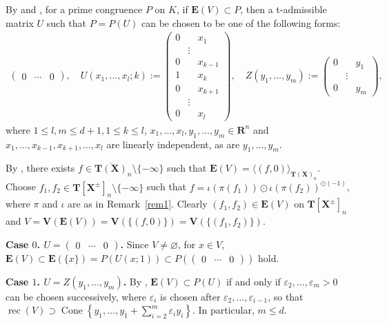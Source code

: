 \documentclass[a4paper,12pt]{amsart}
\theoremstyle{plain}
\theoremstyle{definition}
\begin{document}
By \cite[Proposition~2.13]{Joo=Mincheva2} and \cite[Lemmas~3.11 and 3.12]{Nakajima=Song}, for a prime congruence $P$ on $K$, if $\boldsymbol{E}(V) \subset P$, then a t-admissible matrix $U$ such that $P = P(U)$ can be chosen to be one of the following forms:
\begin{align*}
\begin{pmatrix} 0 & \cdots & 0 \end{pmatrix}, \quad U(x_1, \ldots, x_l; k) := \begin{pmatrix} 0 & & x_1 \\ & \vdots & \\ 0 & & x_{k-1} \\ 1 && x_k \\ 0 & &x_{k + 1} \\ & \vdots & \\ 0 && x_l \end{pmatrix}, \quad Z(y_1, \ldots, y_m) := \begin{pmatrix} 0 & & y_1 \\ & \vdots & \\ 0 & & y_m \end{pmatrix},
\end{align*}
where $1 \le l, m \le d + 1, 1 \le k \le l$, $x_1, \ldots, x_l, y_1, \ldots, y_m \in \boldsymbol{R}^n$ and $x_1, \ldots, x_{k - 1}, x_{k + 1}, \ldots, x_l$ are linearly independent, as are $y_1, \ldots, y_m$.

By \cite[the proof of Theorem~1.1]{JuAe6}, there exists $f \in \overline{\boldsymbol{T}(\boldsymbol{X})}_n \setminus \{ -\infty \}$ such that $\boldsymbol{E}(V) = \langle (f, 0) \rangle_{\overline{\boldsymbol{T}(\boldsymbol{X})}_n}$.
Choose $f_1, f_2 \in \boldsymbol{T}[\boldsymbol{X}^{\pm}]_n \setminus \{ -\infty \}$ such that $f = \iota(\pi(f_1)) \odot \iota(\pi(f_2))^{\odot (-1)}$, where $\pi$ and $\iota$ are as in Remark~\ref{rem1}.
Clearly $(f_1, f_2) \in \boldsymbol{E}(V)$ on $\boldsymbol{T}[\boldsymbol{X}^{\pm}]_n$ and $V = \boldsymbol{V}(\boldsymbol{E}(V)) = \boldsymbol{V}(\{(f,0)\}) = \boldsymbol{V}(\{(f_1, f_2)\})$.

\textbf{Case $0$. $U = \begin{pmatrix} 0 & \cdots & 0 \end{pmatrix}$.}
Since $V \not= \varnothing$, for $x \in V$, $\boldsymbol{E}(V) \subset \boldsymbol{E}(\{x\}) = P(U(x;1)) \subset P(\begin{pmatrix} 0 & \cdots & 0 \end{pmatrix})$ hold.

\textbf{Case $1$. $U = Z(y_1, \ldots, y_m)$.}
By \cite[the proof of Proposition~3.22 and Lemma~3.26]{Nakajima=Song}, $\boldsymbol{E}(V) \subset P(U)$ if and only if $\varepsilon_2,\ldots,\varepsilon_m>0$ can be chosen successively, where $\varepsilon_i$ is chosen after $\varepsilon_2,\ldots,\varepsilon_{i-1}$, so that $\operatorname{rec}(V) \supset \operatorname{Cone}\left\{ y_1, \ldots, y_1 + \sum_{i = 2}^m \varepsilon_i y_i \right\}$.
In particular, $m \le d$.
\end{document}
